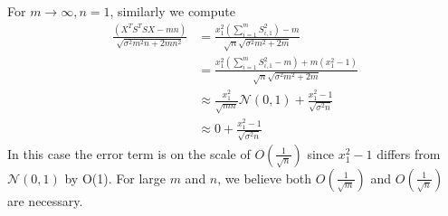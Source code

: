 \documentclass[12pt]{extarticle}
\newcommand{\cN}{{\mathcal{N}}}
\newcommand{\1}{\field{1}}
\DeclareMathOperator{\E}{\mathbb{E}}
\numberwithin{equation}{section}
\begin{document}
For $m\to \infty, n=1$, similarly we compute 
\begin{align*}
    \frac{\left(X^TS^TSX - mn\right)}{ \sqrt{ \sigma^2 m^2n+2mn^2}}   
    & = \frac{x_1^2 \left(\sum_{i=1}^m S_{i,1}^2 \right) - m}{ \sqrt{n}\sqrt{ \sigma^2 m^2 +2m}}  \\
    & = \frac{x_1^2 \left(\sum_{i=1}^m S_{i,1}^2-m \right) +m(x_1^2-1)}{ \sqrt{n}\sqrt{ \sigma^2 m^2 +2m}}  \\
    & \approx \frac{x_1^2}{\sqrt{mn}} \cN(0,1) + \frac{x_1^2-1}{\sqrt{\sigma^2 n}} \\
    & \approx 0 + \frac{x_1^2-1}{\sqrt{\sigma^2 n}}
\end{align*}
In this case the error term is on the scale of $O(\frac{1}{\sqrt{n}})$ since $x_1^2-1$ differs from $\cN(0,1)$ by O(1). For large $m$ and $n$, we believe both $O(\frac{1}{\sqrt{m}})$ and $O(\frac{1}{\sqrt{n}})$ are necessary. 

\end{document}
